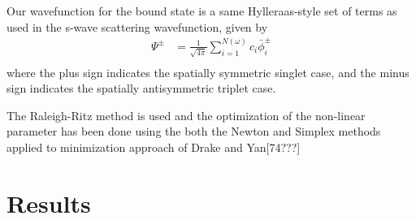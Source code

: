 \documentclass[preprint,showpacs,preprintnumbers,amsmath,amssymb]{revtex4}
\begin{document}
Our wavefunction for the bound state is a same  Hylleraas-style set of terms as used in the s-wave scattering wavefunction, given by
\begin{subequations}
\label{eq:BoundWavefn}
\begin{align}
\Psi^\pm &= \frac{1}{\sqrt{4\pi}} \sum_{i=1}^{N(\omega)} c_i \bar{\phi}_i^\pm \label{eq:BoundWavefn_psi} \\
\end{align}
\end{subequations}
\noindent where the plus sign indicates the spatially symmetric singlet case, and the minus sign indicates the spatially antisymmetric triplet case.

The Raleigh-Ritz method is used and the optimization of the non-linear parameter has been done using the both the Newton and Simplex methods applied to minimization approach of Drake and Yan[74???]




\section{Results}
\end{document}
